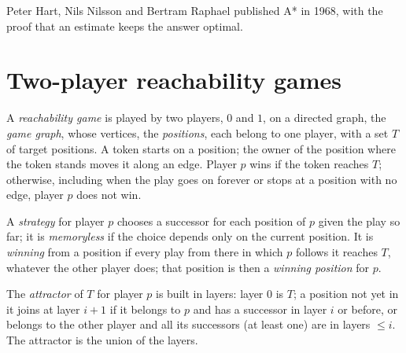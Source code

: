 \begin{history}
Peter Hart, Nils Nilsson and Bertram Raphael published A* in 1968, with the proof that an  estimate keeps the
answer optimal.
\end{history}

\section{Two-player reachability games}\label{sec:b2:search-and-games:games}


\begin{definition}\label{def:b2:search-and-games:game}
A \emph{reachability game} is played by two players, $0$ and $1$, on a directed graph, the
\emph{game graph}, whose vertices, the \emph{positions}, each belong to one
player, with a set $T$ of target positions. A token starts on a position; the owner of the position where the token
stands moves it along an edge. Player $p$ wins if the token reaches $T$; otherwise, including when the play goes on
forever or stops at a position with no edge, player $p$ does not win.
\end{definition}

\begin{definition}\label{def:b2:search-and-games:strategy}
A \emph{strategy} for player $p$ chooses a successor for each position of $p$ given the play so
far; it is \emph{memoryless} if the choice depends only on the current position. It is
\emph{winning} from a position if every play from there in which $p$ follows it reaches $T$,
whatever the other player does; that position is then a \emph{winning position} for $p$.
\end{definition}

\begin{definition}[Attractor]\label{def:b2:search-and-games:attractor}
The \emph{attractor} of $T$ for player $p$ is built in layers: layer $0$ is $T$; a position not yet in
it joins at layer $i + 1$ if it belongs to $p$ and has a successor in layer $i$ or before, or belongs to the other player
and all its successors (at least one) are in layers $\leq i$. The attractor is the union of the layers.
\end{definition}


